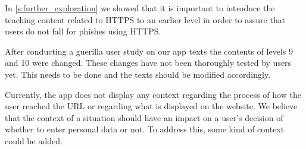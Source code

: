 \begin{description}[leftmargin=0cm]
	\item[Introduce HTTPS Earlier] In \autoref{s:further_exploration} we showed that it is important to introduce the teaching content related to HTTPS to an earlier level in order to assure that users do not fall for phishes using HTTPS.
	\item[Text Improvements:] After conducting a guerilla user study on our app texts the contents of levels 9 and 10 were changed. These changes have not been thoroughly tested by users yet.  This needs to be done and the texts should be modified accordingly. 
	\item[Add context:] Currently, the app does not display any context regarding the process of how the user reached the URL or regarding what is displayed on the website. We believe that the context of a situation should have an impact on a user's decision of whether to enter personal data or not. To address this, some kind of context could be added.
\end{description}

